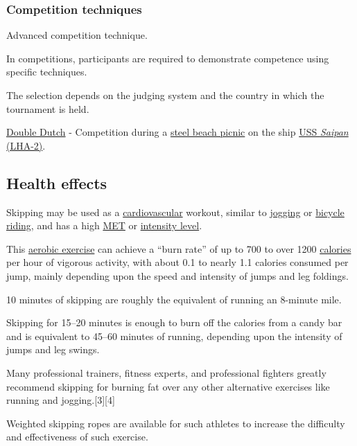 \documentclass[oneside]{book}
\numberwithin{equation}{section}
\begin{document}
\subsubsection{Competition techniques}
\textsf{Advanced competition technique.}

In competitions, participants are required to demonstrate competence using specific techniques.

The selection depends on the judging system and the country in which the tournament is held.

\textsf{\href{https://en.wikipedia.org/wiki/Double_Dutch_(jump_rope)}{Double Dutch} - Competition during a \href{https://en.wikipedia.org/wiki/Steel_beach_picnic}{steel beach picnic} on the ship \href{https://en.wikipedia.org/wiki/USS_Saipan_(LHA-2)}{USS \textit{Saipan} (LHA-2)}.}

\subsection{Health effects}
Skipping may be used as a \href{https://en.wikipedia.org/wiki/Cardiovascular}{cardiovascular} workout, similar to \href{https://en.wikipedia.org/wiki/Jogging}{jogging} or \href{https://en.wikipedia.org/wiki/Cycling}{bicycle riding}, and has a high \href{https://en.wikipedia.org/wiki/Metabolic_equivalent}{MET} or \href{https://en.wikipedia.org/wiki/Exercise_intensity#Intensity_Levels}{intensity level}.

This \href{https://en.wikipedia.org/wiki/Aerobic_exercise}{aerobic exercise} can achieve a ``burn rate'' of up to 700 to over 1200 \href{https://en.wikipedia.org/wiki/Calorie}{calories} per hour of vigorous activity, with about 0.1 to nearly 1.1 calories consumed per jump, mainly depending upon the speed and intensity of jumps and leg foldings.

10 minutes of skipping are roughly the equivalent of running an 8-minute mile.

Skipping for 15--20 minutes is enough to burn off the calories from a candy bar and is equivalent to 45--60 minutes of running, depending upon the intensity of jumps and leg swings.

Many professional trainers, fitness experts, and professional fighters greatly recommend skipping for burning fat over any other alternative exercises like running and jogging.[3][4]

%
Weighted skipping ropes are available for such athletes to increase the difficulty and effectiveness of such exercise.
\end{document}
